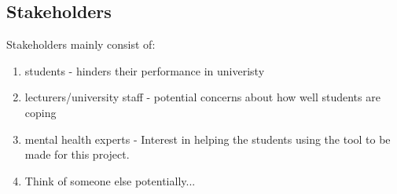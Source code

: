\subsection{Stakeholders}

Stakeholders mainly consist of: 

\begin{enumerate}
    \item students - hinders their performance in univeristy
    \item lecturers/university staff - potential concerns about how well students are coping
    \item mental health experts - Interest in helping the students using the tool to be made for this project.
    \item Think of someone else potentially...  
\end{enumerate}